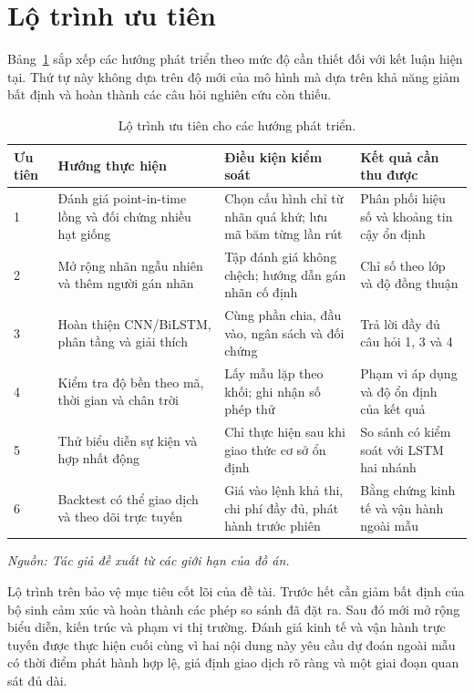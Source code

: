 \documentclass[12pt, a4paper, oneside]{report}
\begin{document}
\section{Lộ trình ưu tiên}

Bảng~\ref{tab:huong-phat-trien-uu-tien} sắp xếp các hướng phát triển theo mức độ cần
thiết đối với kết luận hiện tại. Thứ tự này không dựa trên độ mới của mô hình mà dựa
trên khả năng giảm bất định và hoàn thành các câu hỏi nghiên cứu còn thiếu.

\begin{table}[H]
  \centering
  \small
  \caption{Lộ trình ưu tiên cho các hướng phát triển.}
  \label{tab:huong-phat-trien-uu-tien}
  \begin{tabular}{p{0.9cm} p{3.5cm} p{4.3cm} p{3.2cm}}
    \toprule
    Ưu tiên & Hướng thực hiện & Điều kiện kiểm soát & Kết quả cần thu được \\
    \midrule
    1 & Đánh giá point-in-time lồng và đối chứng nhiều hạt giống &
    Chọn cấu hình chỉ từ nhãn quá khứ; lưu mã băm từng lần rút &
    Phân phối hiệu số và khoảng tin cậy ổn định \\
    2 & Mở rộng nhãn ngẫu nhiên và thêm người gán nhãn &
    Tập đánh giá không chệch; hướng dẫn gán nhãn cố định &
    Chỉ số theo lớp và độ đồng thuận \\
    3 & Hoàn thiện CNN/BiLSTM, phân tầng và giải thích &
    Cùng phần chia, đầu vào, ngân sách và đối chứng &
    Trả lời đầy đủ câu hỏi 1, 3 và 4 \\
    4 & Kiểm tra độ bền theo mã, thời gian và chân trời &
    Lấy mẫu lặp theo khối; ghi nhận số phép thử &
    Phạm vi áp dụng và độ ổn định của kết quả \\
    5 & Thử biểu diễn sự kiện và hợp nhất động &
    Chỉ thực hiện sau khi giao thức cơ sở ổn định &
    So sánh có kiểm soát với LSTM hai nhánh \\
    6 & Backtest có thể giao dịch và theo dõi trực tuyến &
    Giá vào lệnh khả thi, chi phí đầy đủ, phát hành trước phiên &
    Bằng chứng kinh tế và vận hành ngoài mẫu \\
    \bottomrule
  \end{tabular}
\noindent\textit{Nguồn: Tác giả đề xuất từ các giới hạn của đồ án.}
\end{table}

Lộ trình trên bảo vệ mục tiêu cốt lõi của đề tài. Trước hết cần giảm bất định của bộ
sinh cảm xúc và hoàn thành các phép so sánh đã đặt ra. Sau đó mới mở rộng biểu diễn,
kiến trúc và phạm vi thị trường. Đánh giá kinh tế và vận hành trực tuyến được thực hiện
cuối cùng vì hai nội dung này yêu cầu dự đoán ngoài mẫu có thời điểm phát hành hợp lệ,
giả định giao dịch rõ ràng và một giai đoạn quan sát đủ dài.
\end{document}

